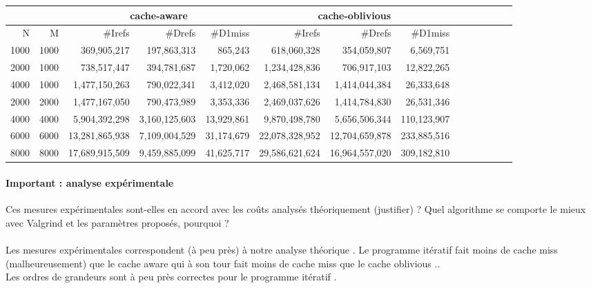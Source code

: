\documentclass[10pt,a4paper]{article}
\begin{document}
\begin{tabular}{|r|r||r|r|r||r|r|r||r|r|r||r|r|r||}
  \hline
   \multicolumn{2}{|c||}{ }
   & \multicolumn{3}{c||}{cache-aware}
& \multicolumn{3}{c||}{cache-oblivious}
\\ \hline
N & M 

& \#Irefs & \#Drefs & \#D1miss %
& \#Irefs & \#Drefs & \#D1miss %
\\ \hline
\hline
1000 & 1000 
& 369,905,217 & 197,863,313 & 865,243  %
& 618,060,328 & 354,059,807 & 6,569,751  %
\\ \hline
2000 & 1000 

& 738,517,447 & 394,781,687 & 1,720,062  %
& 1,234,428,836 & 706,917,103  & 12,822,265   %
\\ \hline
4000 & 1000 
& 1,477,150,263 & 790,022,341  & 3,412,020   %
& 2,468,581,134 & 1,414,044,384 & 26,333,648   %
\\ \hline
2000 & 2000 
& 1,477,167,050 & 790,473,989 & 3,353,336   %
& 2,469,037,626 & 1,414,784,830 & 26,531,346  %
\\ \hline
4000 & 4000 

& 5,904,392,298 & 3,160,125,603  & 13,929,861 %
&  9,870,498,780 & 5,656,506,344 & 110,123,907  %
\\ \hline
6000 & 6000 

& 13,281,865,938 &  7,109,004,529 & 31,174,679  %
& 22,078,328,952 & 12,704,659,878  & 233,885,516  %
\\ \hline
8000 & 8000 

& 17,689,915,509 & 9,459,885,099 & 41,625,717  %
& 29,586,621,624 & 16,964,557,020 & 309,182,810  %
\\ \hline
\hline
\end{tabular}


\paragraph{Important : analyse expérimentale}
Ces mesures expérimentales sont-elles en accord avec les coûts analysés théoriquement (justifier) ? 
Quel algorithme se comporte le mieux avec Valgrind et les paramètres proposés, pourquoi ? \\
\\Les mesures expérimentales correspondent (à peu près) à notre analyse théorique . Le programme itératif fait moins de cache miss (malheureusement) que le cache
aware qui à son tour fait moins de cache miss que le cache oblivious .. \\
Les ordres de grandeurs sont à peu près correctes pour le programme itératif . \\  
\end{document}
